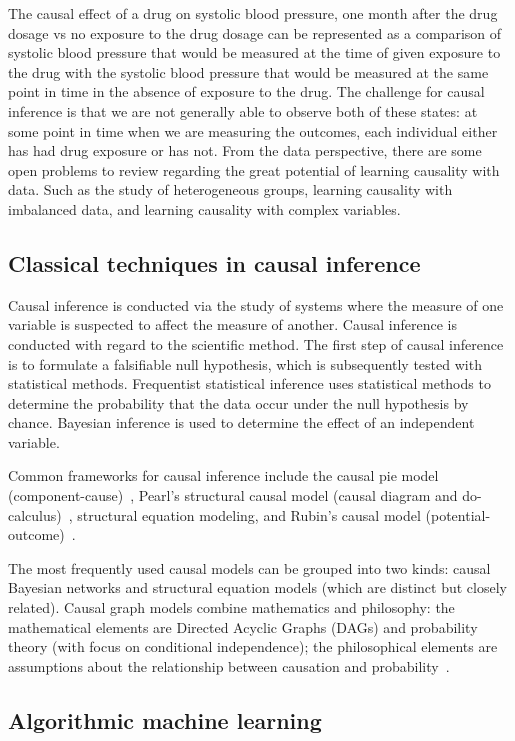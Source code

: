 \documentclass[%
 aps,
 jmp,%
 amsmath,amssymb,
 reprint,%
]{revtex4-2}
\begin{document}
The causal effect of a drug on systolic blood pressure, one month after the drug dosage vs no exposure to the drug dosage can be represented as a comparison of systolic blood pressure that would be measured at the time of given exposure to the drug with the systolic blood pressure that would be measured at the same point in time in the absence of exposure to the drug.
The challenge for causal inference is that we are not generally able to observe both of these states: at some point in time when we are measuring the outcomes, each individual either has had drug exposure or has not.
From the data perspective, there are some open problems to review regarding the great potential of learning causality with data. 
Such as the study of heterogeneous groups, learning causality with imbalanced data, and learning causality with complex variables.
\subsection{Classical techniques in causal inference}
Causal inference is conducted via the study of systems where the measure of one variable is suspected to affect the measure of another. 
Causal inference is conducted with regard to the scientific method. 
The first step of causal inference is to formulate a falsifiable null hypothesis, which is subsequently tested with statistical methods.
Frequentist statistical inference uses statistical methods to determine the probability that the data occur under the null hypothesis by chance.
Bayesian inference is used to determine the effect of an independent variable.

Common frameworks for causal inference include the causal pie model (component-cause)~\cite{rothman2005causation}, Pearl's structural causal model (causal diagram and do-calculus)~\cite{pearl2000models}, structural equation modeling, and Rubin's causal model (potential-outcome)~\cite{imbens2015causal}.

The most frequently used causal models can be grouped into two kinds: causal Bayesian networks and structural equation models (which are distinct but closely related). %
Causal graph models combine mathematics and philosophy: the mathematical elements are Directed Acyclic Graphs (DAGs) and probability theory (with focus on conditional independence); the philosophical elements are assumptions about the relationship between causation and probability~\cite{spirtes2000causation}.

\subsection{Algorithmic machine learning}
\end{document}
